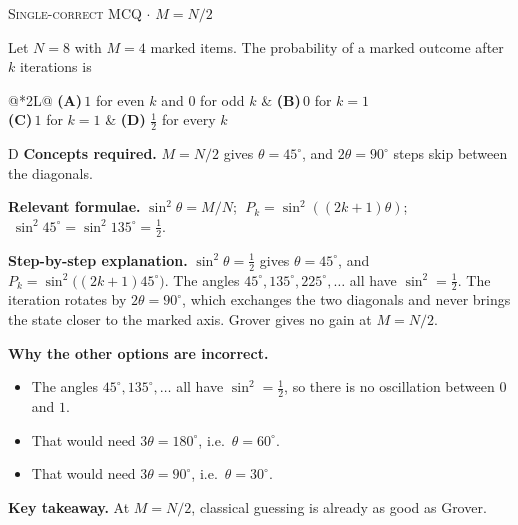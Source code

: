 \documentclass[11pt,a4paper]{article}
\newcommand{\optlabel}[1]{\textbf{(#1)}}
\newcommand{\correctlabel}[1]{\textcolor{okgreen}{\textbf{(#1)}\,\ding{51}}}
\newenvironment{qitem}[1]{\begin{list}{}{\setlength{\leftmargin}{3.3em}\setlength{\labelwidth}{3.1em}%
  \setlength{\labelsep}{0.2em}\setlength{\topsep}{3pt}\setlength{\parsep}{3pt}}\item[\textbf{Q.#1}\hfill]}{\end{list}}
\newcommand{\qsep}{\par\vspace{2pt}{\color{black!15}\hrule}\vspace{4pt}}
\newcommand{\qmeta}[2]{{\footnotesize\color{black!60}\textsc{#1} \;$\cdot$\; #2}\par}
\begin{document}
\begin{qitem}{50}
\qmeta{Single-correct MCQ}{$M = N/2$}
Let $N = 8$ with $M = 4$ marked items. The probability of a marked outcome after $k$ iterations is
\par\smallskip\noindent\begin{tabularx}{\linewidth}{@{}*{2}{L}@{}}
\optlabel{A}\,$1$ for even $k$ and $0$ for odd $k$ & \optlabel{B}\,$0$ for $k = 1$ \\[3pt]
\optlabel{C}\,$1$ for $k = 1$ & \correctlabel{D}\,$\frac12$ for every $k$
\end{tabularx}
\end{qitem}
\begin{solbox}{D}
\textbf{\color{brand}Concepts required.} $M = N/2$ gives $\theta = 45^\circ$, and $2\theta = 90^\circ$ steps skip between the diagonals.

\textbf{\color{brand}Relevant formulae.} $\sin^2\theta = M/N$; $\;P_k = \sin^2((2k+1)\theta)$; $\;\sin^2 45^\circ = \sin^2 135^\circ = \frac12$.

\textbf{\color{brand}Step-by-step explanation.} $\sin^2\theta = \frac12$ gives $\theta = 45^\circ$, and $P_k = \sin^2\big((2k+1)45^\circ\big)$. The angles $45^\circ, 135^\circ, 225^\circ, \dots$ all have $\sin^2 = \frac12$.
The iteration rotates by $2\theta = 90^\circ$, which exchanges the two diagonals and never brings the state closer to the marked axis. Grover gives no gain at $M = N/2$.

\textbf{\color{brand}Why the other options are incorrect.}
\begin{itemize}[leftmargin=2.4em, itemsep=1pt, topsep=2pt]
\item[\textbf{(A)}] The angles $45^\circ, 135^\circ, \dots$ all have $\sin^2 = \frac12$, so there is no oscillation between $0$ and $1$.
\item[\textbf{(B)}] That would need $3\theta = 180^\circ$, i.e.\ $\theta = 60^\circ$.
\item[\textbf{(C)}] That would need $3\theta = 90^\circ$, i.e.\ $\theta = 30^\circ$.
\end{itemize}
\textbf{\color{brand}Key takeaway.} At $M = N/2$, classical guessing is already as good as Grover.
\end{solbox}
\qsep
\end{document}
